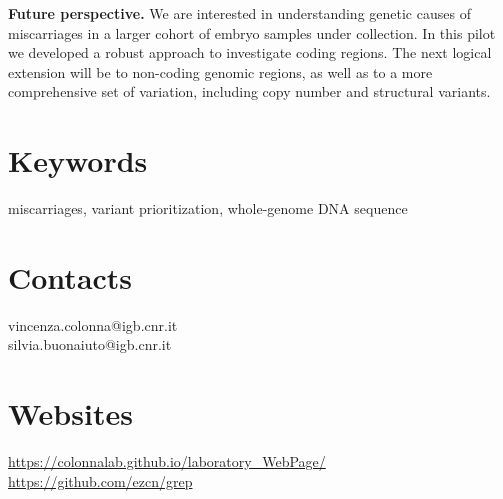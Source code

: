 \documentclass[fleqn,12pt]{wlscirep}
\newcommand{\beginsupplement}{%
        \setcounter{table}{0}
        \renewcommand{\thetable}{S\arabic{table}}%
        \setcounter{figure}{0}
        \renewcommand{\thefigure}{S\arabic{figure}}%
     }
\begin{document}


\textbf{Future perspective.} We are interested in understanding genetic causes of miscarriages in a larger cohort of embryo samples under collection. In this pilot we developed a robust approach to investigate coding regions. The next logical extension will be to non-coding genomic regions, as well as to a more comprehensive set of variation, including copy number and structural variants. 



%
%

\section*{Keywords}
miscarriages, variant prioritization, whole-genome DNA sequence
\section*{Contacts}
vincenza.colonna@igb.cnr.it\\
silvia.buonaiuto@igb.cnr.it
\section*{Websites}
\url{https://colonnalab.github.io/laboratory_WebPage/}
\url{https://github.com/ezcn/grep}

%

%

%
%
\end{document}
